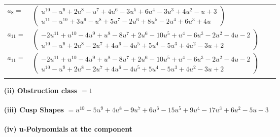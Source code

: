 \documentclass[1p]{elsarticle_modified}
\theoremstyle{definition}
\begin{document}
\begin{tabular}{m{7pt} m{180pt} m{7pt} m{180pt} }
\flushright $a_{8}=$&$\begin{pmatrix}u^{10}- u^9+2 u^8- u^7+4 u^6-3 u^5+6 u^4-3 u^3+4 u^2- u+3\\u^{11}- u^{10}+3 u^9- u^8+5 u^7-2 u^6+8 u^5-2 u^4+6 u^3+4 u\end{pmatrix}$ \\
\flushright $a_{11}=$&$\begin{pmatrix}-2 u^{11}+u^{10}-4 u^9+u^8-8 u^7+2 u^6-10 u^5+u^4-6 u^3-2 u^2-4 u-2\\u^{10}- u^9+2 u^8-2 u^7+4 u^6-4 u^5+5 u^4-5 u^3+4 u^2-3 u+2\end{pmatrix}$\\ \flushright $a_{11}=$&$\begin{pmatrix}-2 u^{11}+u^{10}-4 u^9+u^8-8 u^7+2 u^6-10 u^5+u^4-6 u^3-2 u^2-4 u-2\\u^{10}- u^9+2 u^8-2 u^7+4 u^6-4 u^5+5 u^4-5 u^3+4 u^2-3 u+2\end{pmatrix}$\\&\end{tabular}
\flushleft \textbf{(ii) Obstruction class $= 1$}\\~\\
\flushleft \textbf{(iii) Cusp Shapes $= u^{10}-5 u^9+4 u^8-9 u^7+6 u^6-15 u^5+9 u^4-17 u^3+6 u^2-5 u-3$}\\~\\
\newpage\renewcommand{\arraystretch}{1}
\flushleft \textbf{(iv) u-Polynomials at the component}\newline \\
\end{document}
